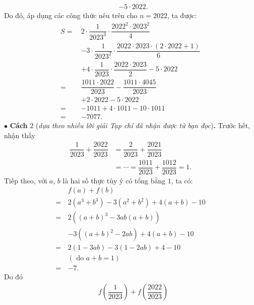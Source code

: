 \begin{multicols}{2}
\begin{align*}
			 &- 5 \cdot 2022.
	\end{align*}
	Do đó, áp dụng các công thức nêu trên cho $n = 2022$, ta được:
	\begin{align*}
			S =\, &2 \cdot \dfrac{1}{{{{2023}^3}}} \cdot \dfrac{{{{2022}^2} \cdot {{2023}^2}}}{4} \\
			&- 3 \cdot \dfrac{1}{{{{2023}^2}}} \cdot \dfrac{{2022 \cdot 2023 \cdot \left( {2 \cdot 2022 + 1} \right)}}{6} \\
			&+ 4 \cdot \dfrac{1}{{2023}} \cdot \dfrac{{2022 \cdot 2023}}{2} - 5 \cdot 2022\\
			 = \,&\dfrac{{1011 \cdot 2022}}{{2023}} - \dfrac{{1011 \cdot 4045}}{{2023}} \\
			 &+ 2 \cdot 2022 - 5 \cdot 2022\\
			 =  \,&- 1011 + 4 \cdot 1011 - 10 \cdot 1011\\
			 = \,& - 7077.
	\end{align*}
	$\bullet$ \textbf{\color{thachthuctoanhoc}Cách} $2$ (\textit{dựa theo nhiều lời giải Tạp chí đã nhận được từ bạn đọc})\textbf{\color{thachthuctoanhoc}.}
	\vskip 0.05cm
	Trước hết, nhận thấy
	\begin{align*}
		\dfrac{1}{{2023}} + \dfrac{{2022}}{{2023}} &= \dfrac{2}{{2023}} + \dfrac{{2021}}{{2023}} \\[-0.6ex]
		&=  \cdots  = \dfrac{{1011}}{{2023}} + \dfrac{{1012}}{{2023}} = 1.
	\end{align*}
	Tiếp theo, với $a$, $b$ là hai số thực tùy ý có tổng bằng $1$, ta có:
	\begin{align*}
			&f\left( a \right) + f\left( b \right)\\[-0.3ex]
			 = \,&2\left( {{a^3} \!+\! {b^3}} \right) \!-\! 3\left( {{a^2} \!+\! {b^2}} \right) \!+\! 4\left( {a \!+\! b} \right) \!-\! 10\\[-0.3ex]
			 = \,&2\left( {{{\left( {a + b} \right)}^3} - 3ab\left( {a + b} \right)} \right) \\[-0.3ex]
			 &- 3\left( {{{\left( {a + b} \right)}^2} - 2ab} \right) + 4\left( {a + b} \right) - 10\\[-0.3ex]
			 = \,&2\left( {1 - 3ab} \right) - 3\left( {1 - 2ab} \right) + 4 - 10\\
			 &(\text{{ do }}a + b = 1)\\[-0.3ex]
			 =  \,&- 7.
	\end{align*}
	Do đó
	\begin{align*}
		&f\left( {\dfrac{1}{{2023}}} \right) + f\left( {\dfrac{{2022}}{{2023}}} \right) \\[-0.3ex]

\end{align*}
\end{multicols}
